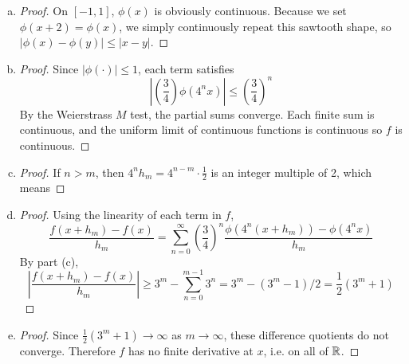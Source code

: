 \documentclass[11pt]{article}
\begin{document}
\begin{exercise}{3}
    \begin{enumerate} [(a)]
        \item \begin{proof}
            On $[-1, 1]$, $\phi(x)$ is obviously continuous. Because we set $\phi(x+2) = \phi(x)$, we simply continuously repeat this sawtooth shape, so $|\phi(x) - \phi(y)| \le |x - y|$. 
        \end{proof}
        \item \begin{proof}
            Since $|\phi(\cdot)| \le 1$, each term satisfies $$\left| \left(\frac{3}{4} \right) \phi(4^nx) \right| \le \left( \frac{3}{4} \right)^n$$ By the Weierstrass $M$ test, the partial sums converge. Each finite sum is continuous, and the uniform limit of continuous functions is continuous so $f$ is continuous. 
        \end{proof}
        \item \begin{proof}
            If $n > m$, then $4^n h_m = 4^{n - m} \cdot \frac{1}{2}$ is an integer multiple of 2, which means 
        \end{proof}
        \item \begin{proof}
            Using the linearity of each term in $f$, $$\frac{f(x + h_m) - f(x)}{h_m} = \sum_{n = 0}^\infty \left( \frac{3}{4} \right)^n \frac{\phi(4^n(x+h_m)) - \phi(4^nx)}{h_m}$$ By part (c), $$\left| \frac{f(x+h_m) - f(x)}{h_m} \right| \ge 3^m - \sum_{n = 0}^{m - 1} 3^n = 3^m - (3^m - 1)/2 = \frac{1}{2} (3^m + 1)$$
        \end{proof}
        \item \begin{proof}
            Since $\frac{1}{2}(3^m + 1) \to \infty$ as $m \to \infty$, these difference quotients do not converge. Therefore $f$ has no finite derivative at $x$, i.e. on all of $\mathbb{R}$. 
        \end{proof}
    \end{enumerate}
\end{exercise}
\end{document}
